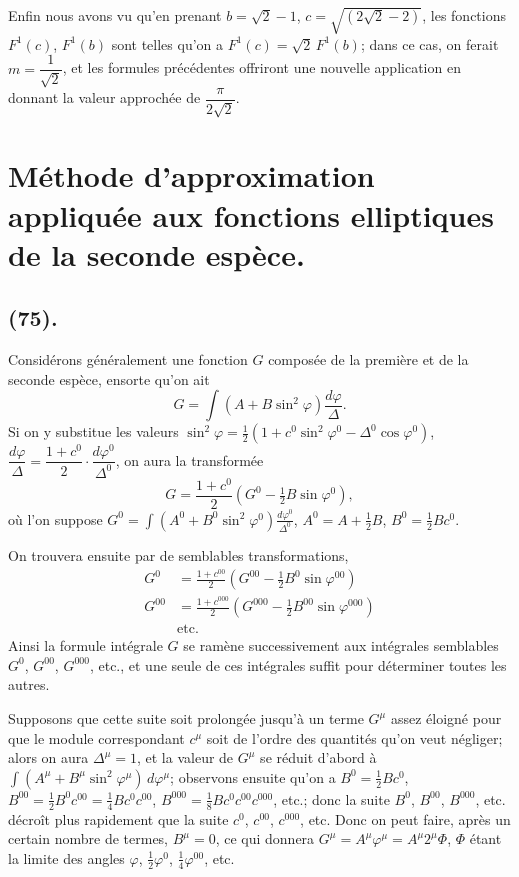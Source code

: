 \documentclass{article}
\begin{document}
Enfin nous avons vu qu'en prenant $b=\sqrt{2}-1$, $c=\sqrt{(2\sqrt{2}-2)}$, les fonctions $F^{1}(c)$, $F^{1}(b)$ sont telles qu'on a $F^{1}(c)=\sqrt{2}\,F^{1}(b)$; dans ce cas, on ferait $m=\dfrac{1}{\sqrt{2}}$, et les formules précédentes offriront une nouvelle application en donnant la valeur approchée de $\dfrac{\pi}{2\sqrt{2}}$.

\section*{Méthode d'approximation appliquée aux fonctions elliptiques de la seconde espèce.}

\subsection*{(75).}

Considérons généralement une fonction $G$ composée de la première et de la seconde espèce, ensorte qu'on ait
\[ G=\int(A+B\sin^{2}\varphi)\frac{d\varphi}{\Delta}. \]
Si on y substitue les valeurs $\sin^{2}\varphi=\frac{1}{2}(1+c^{0}\sin^{2}\varphi^{0}-\Delta^{0}\cos\varphi^{0})$, $\dfrac{d\varphi}{\Delta}=\dfrac{1+c^{0}}{2}\cdot\dfrac{d\varphi^{0}}{\Delta^{0}}$, on aura la transformée
\[ G=\frac{1+c^{0}}{2}(G^{0}-\tfrac{1}{2}B\sin\varphi^{0}), \]
où l'on suppose $G^{0}=\displaystyle\int(A^{0}+B^{0}\sin^{2}\varphi^{0})\frac{d\varphi^{0}}{\Delta^{0}}$, $A^{0}=A+\frac{1}{2}B$, $B^{0}=\frac{1}{2}Bc^{0}$.

On trouvera ensuite par de semblables transformations,
\[ \begin{aligned} G^{0}&=\frac{1+c^{00}}{2}(G^{00}-\tfrac{1}{2}B^{0}\sin\varphi^{00})\\ G^{00}&=\frac{1+c^{000}}{2}(G^{000}-\tfrac{1}{2}B^{00}\sin\varphi^{000})\\ &\text{etc.} \end{aligned} \]
Ainsi la formule intégrale $G$ se ramène successivement aux intégrales semblables $G^{0}$, $G^{00}$, $G^{000}$, etc., et une seule de ces intégrales suffit pour déterminer toutes les autres.

Supposons que cette suite soit prolongée jusqu'à un terme $G^{\mu}$ assez éloigné pour que le module correspondant $c^{\mu}$ soit de l'ordre des quantités qu'on veut négliger; alors on aura $\Delta^{\mu}=1$, et la valeur de $G^{\mu}$ se réduit d'abord à $\displaystyle\int(A^{\mu}+B^{\mu}\sin^{2}\varphi^{\mu})\,d\varphi^{\mu}$; observons ensuite qu'on a $B^{0}=\frac{1}{2}Bc^{0}$, $B^{00}=\frac{1}{2}B^{0}c^{00}=\frac{1}{4}Bc^{0}c^{00}$, $B^{000}=\frac{1}{8}Bc^{0}c^{00}c^{000}$, etc.; donc la suite $B^{0}$, $B^{00}$, $B^{000}$, etc. décroît plus rapidement que la suite $c^{0}$, $c^{00}$, $c^{000}$, etc. Donc on peut faire, après un certain nombre de termes, $B^{\mu}=0$, ce qui donnera $G^{\mu}=A^{\mu}\varphi^{\mu}=A^{\mu}2^{\mu}\Phi$, $\Phi$ étant la limite des angles $\varphi$, $\frac{1}{2}\varphi^{0}$, $\frac{1}{4}\varphi^{00}$, etc.
\end{document}
